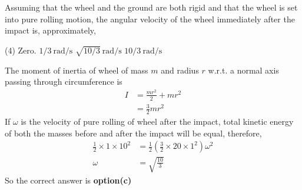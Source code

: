 \begin{enumerate}[label=\color{ocre}\textbf{\arabic*.}]
\begin{figure}[H]
\end{figure}
 Assuming that the wheel and the ground are both rigid and that the wheel is set into pure rolling motion, the angular velocity of the wheel immediately after the impact is, approximately,
 \begin{tasks}(4)
 	\task[\textbf{a.}]Zero. 
 	\task[\textbf{b.}]$1 / 3 \ \mathrm{rad} / \mathrm{s}$
 	\task[\textbf{c.}]$\sqrt{10 / 3}\  \mathrm{rad} / \mathrm{s}$ 
 	\task[\textbf{d.}]$10 / 3 \ \mathrm{rad} / \mathrm{s}$   
 \end{tasks}
\begin{answer}
	The moment of inertia of wheel of mass $m$ and radius $r$ w.r.t. a normal axis passing through circumference is
	\begin{align*}
	I &=\frac{m r^{2}}{2}+m r^{2} \\
	&=\frac{3}{2} m r^{2}
	\end{align*}
	If $\omega$ is the velocity of pure rolling of wheel after the impact, total kinetic energy of both the masses before and after the impact will be equal, therefore,
	\begin{align*}
	\frac{1}{2} \times 1 \times 10^{2} &=\frac{1}{2}\left(\frac{3}{2} \times 20 \times 1^{2}\right) \omega^{2} \\
	\omega &=\sqrt{\frac{10}{3}}
	\end{align*}
	So the correct answer is \textbf{option(c)}
\end{answer}
\end{enumerate}



